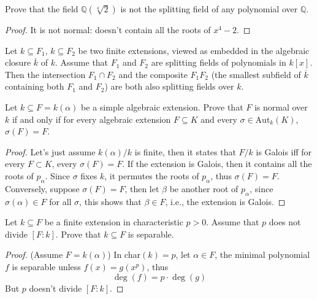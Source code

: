 \documentclass[openany]{book}
\begin{document}
        \begin{prob}
        Prove that the field \(\mathbb{Q}(\sqrt[4]{2})\) is not the splitting field of any polynomial over \(\mathbb{Q}\).
        \end{prob}
        \begin{proof}
            It is not normal: doesn't contain all the roots of $x^4-2$.
        \end{proof}
        
        
        \begin{prop}
        Let \( k \subseteq F_1, \, k \subseteq F_2 \) be two finite extensions, viewed as embedded in the algebraic closure \(\overline{k}\) of \( k \). Assume that \( F_1 \) and \( F_2 \) are splitting fields of polynomials in \( k[x] \). Then the intersection \( F_1 \cap F_2 \) and the composite \( F_1F_2 \) (the smallest subfield of \(\overline{k}\) containing both \( F_1 \) and \( F_2 \)) are both also splitting fields over \( k \).
        \end{prop}
        
        \begin{prob}
        Let \( k \subseteq F = k(\alpha) \) be a simple algebraic extension. Prove that \( F \) is normal over \( k \) if and only if for every algebraic extension \( F \subseteq K \) and every \( \sigma \in \text{Aut}_k(K) \), \( \sigma(F) = F \).
        \end{prob}
        \begin{proof}
            Let's just assume $k(\alpha)/k$ is finite, then it states that $F/k$ is Galois iff for every $F\subset K$, every $\sigma(F)=F$. If the extension is Galois, then it contains all the roots of $p_\alpha$. Since $\sigma$ fixes $k$, it permutes the roots of $p_\alpha$, thus $\sigma(F)=F$. Conversely, suppose $\sigma(F)=F$, then let $\beta$ be another root of $p_\alpha$, since $\sigma(\alpha)\in F$ for all $\sigma$, this shows that $\beta\in F$, i.e., the extension is Galois.
        \end{proof}
    
    
    
    \begin{prob}
    Let \( k \subseteq F \) be a finite extension in characteristic \( p > 0 \). Assume that \( p \) does not divide \([F : k]\). Prove that \( k \subseteq F \) is separable.
    \end{prob}
    \begin{proof}
        (Assume $F=k(\alpha)$)
        In char$(k)=p$, let $\alpha\in F$, the minimal polynomial $f$ is separable unless $f(x)=g(x^p)$, thus 
        \begin{equation*}
            \deg(f)=p\cdot\deg(g)
        \end{equation*}
        But $p$ doesn't divide $[F:k]$.
    \end{proof}
    
\end{document}
